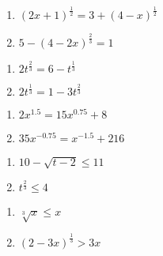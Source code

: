 \documentclass{ximera}
\begin{document}
\begin{multicols}{2}
\begin{enumerate}
\setcounter{enumi}{\value{HW}}

\item $(2x+1)^{\frac{1}{2}} = 3 + (4-x)^{\frac{1}{2}}$
\item  $5 - (4-2x)^{\frac{2}{3}} = 1$

\setcounter{HW}{\value{enumi}}
\end{enumerate}
\end{multicols}

\begin{multicols}{2}
\begin{enumerate}
\setcounter{enumi}{\value{HW}}

\item  $2t^{\frac{2}{3}} = 6 - t^{\frac{1}{3}}$  %
\item  $2t^{\frac{1}{3}} = 1-3t^{\frac{2}{3}} $  %

\setcounter{HW}{\value{enumi}}
\end{enumerate}
\end{multicols}

\begin{multicols}{2}
\begin{enumerate}
\setcounter{enumi}{\value{HW}}

\item $2x^{1.5} = 15x^{0.75} + 8$  %

\item  $35x^{-0.75} = x^{-1.5} +216$ %

\setcounter{HW}{\value{enumi}}
\end{enumerate}
\end{multicols}

\begin{multicols}{2}
\begin{enumerate}
\setcounter{enumi}{\value{HW}}


\item  $10-\sqrt{t-2} \leq 11$ 
\item  $t^{\frac{2}{3}} \leq 4$ %

\setcounter{HW}{\value{enumi}}
\end{enumerate}
\end{multicols}

\begin{multicols}{2}
\begin{enumerate}
\setcounter{enumi}{\value{HW}}


\item  $\sqrt[3]{x} \leq x$   
\item  $(2-3x)^{\frac{1}{3}} > 3x$  %

\setcounter{HW}{\value{enumi}}
\end{enumerate}
\end{multicols}
\end{document}
